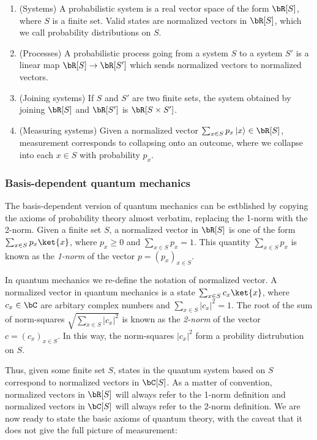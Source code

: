 \begin{defn} $\,$

\begin{enumerate}
\item (Systems) A probabilistic system is a real vector space of the form $\bR[S]$, where $S$ is a finite set. Valid states are normalized vectors in $\bR[S]$, which we call probability distributions on $S$.
\item (Processes) A probabilistic process going from a system $S$ to a system $S'$ is a linear map $\bR[S]\to \bR[S']$ which sends normalized vectors to normalized vectors.
\item (Joining systems) If $S$ and $S'$ are two finite sets, the system obtained by joining $\bR[S]$ and $\bR[S']$ is $\bR[S\times S']$.
\item (Measuring systems) Given a normalized vector $\sum_{x\in S}p_x \left |x\right>\in \bR[S]$, measurement corresponds to collapsing onto an outcome, where we collapse into each $x\in S$ with probability $p_x$.
\end{enumerate}

\raggedleft\qedsymbol{}
\end{defn}

\subsubsection{Basis-dependent quantum mechanics}

The basis-dependent version of quantum mechanics can be estblished by copying the axioms of probability theory almost verbatim, replacing the 1-norm with the 2-norm. Given a finite set $S$, a normalized vector in $\bR[S]$ is one of the form $\sum_{x\in S}p_x \ket{x}$, where $p_x\geq 0$ and $\sum_{x\in S}p_x=1$.  This quantity $\sum_{x\in S}p_x$ is known as the {\em 1-norm} of the vector $p=(p_x)_{x\in S}$.

In quantum mechanics we re-define the notation of normalized vector. A normalized vector in quantum mechanics is a state $\sum_{x\in S}c_x \ket{x}$, where $c_x\in \bC$ are arbitary complex numbers and $\sum_{x\in S}|c_x|^2=1$. The root of the sum of norm-squares $\sqrt{\sum_{x\in S}|c_x|^2}$ is known as the {\em 2-norm} of the vector $c=(c_x)_{x\in S}$. In this way, the norm-squares $|c_x|^2$ form a probility distrubution on $S$.

Thus, given some finite set $S$, states in the quantum system based on $S$ correspond to normalized vectors in $\bC[S]$. As a matter of convention, normalized vectors in $\bR[S]$ will always refer to the 1-norm definition and normalized vectors in $\bC[S]$ will always refer to the 2-norm definition. We are now ready to state the basic axioms of quantum theory, with the caveat that it does not give the full picture of measurement:


